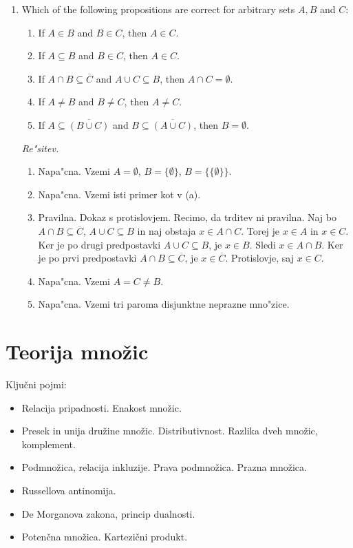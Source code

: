 \documentclass[11pt,paper=b5,footinclude,headinclude]{scrbook} %
\begin{document}
\begin{enumerate}
\item Which of the following propositions are correct for arbitrary sets $A, B$ and $C$:
\begin{enumerate}
\item If $A\in B$ and $B\in C$, then $A\in C$.
\item If $A\subseteq B$ and $B\in C$, then $A\in C$.
\item If $A\cap B\subseteq \overline{C}$ and $A\cup C \subseteq B$, then $A\cap C = \emptyset$.
\item If $A\neq B$ and $B\neq C$, then $A\neq C$.
\item If $A\subseteq \overline{(B\cup C)}$ and $B\subseteq \overline{(A\cup C)}$, then $B=\emptyset$.
\end{enumerate}

\emph{ Re"sitev.}
\begin{enumerate}
\item Napa"cna. Vzemi $A=\emptyset$, $B=\{\emptyset\}$, $B=\{\{\emptyset\}\}$.
\item Napa"cna. Vzemi isti primer kot v (a).
\item Pravilna. Dokaz s protislovjem. Recimo, da trditev ni pravilna. Naj bo $A\cap B\subseteq \overline{C}$, $A\cup C\subseteq B$  in naj obstaja $x\in A\cap C$. Torej je $x\in A$ in $x\in C$. Ker je po drugi predpostavki $A\cup C\subseteq B$, je $x\in B$. Sledi $x\in A \cap B$. Ker je po prvi predpostavki $A\cap B\subseteq \overline{C}$, je $x\in \overline{C}$. Protislovje, saj $x\in C$. 
\item Napa"cna. Vzemi $A=C\neq B$.
\item Napa"cna. Vzemi tri paroma disjunktne neprazne mno"zice.
\end{enumerate}

\end{enumerate}

\chapter{Teorija množic}



Ključni pojmi:
\begin{itemize}
  \item Relacija pripadnosti. Enakost množic.
  \item Presek in unija družine množic. Distributivnost. Razlika dveh množic, komplement.
  \item Podmnožica, relacija inkluzije. Prava podmnožica. Prazna množica.
  \item Russellova antinomija.
  \item De Morganova zakona, princip dualnosti.
  \item Potenčna množica. Kartezični produkt.
\end{itemize}
\end{document}
